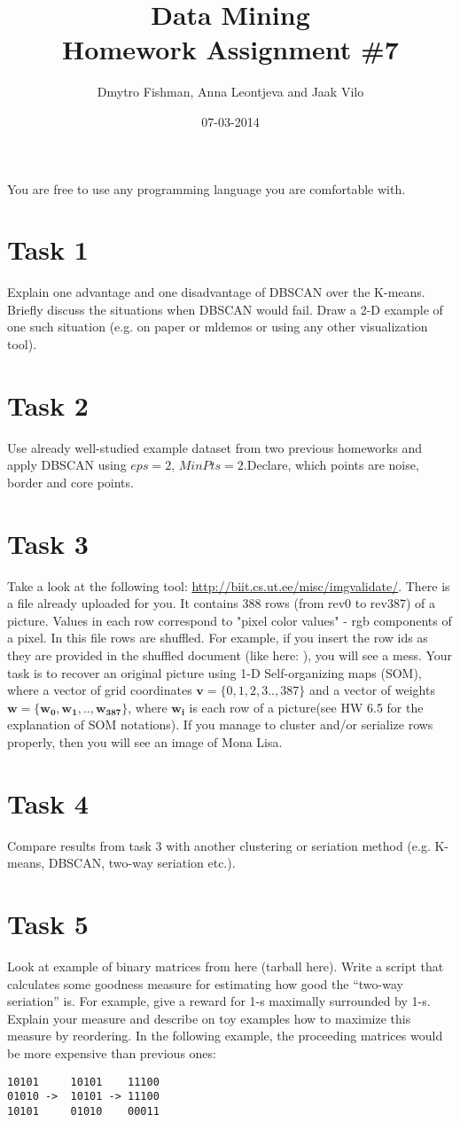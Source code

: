 \documentclass{article}
\title{Data Mining\\Homework Assignment \#7} %
\author{Dmytro Fishman, Anna Leontjeva and Jaak Vilo} %
\date{07-03-2014} %
\begin{document}
\maketitle %

You are free to use any programming language you are comfortable with. 

\section*{Task 1}
Explain one advantage and one disadvantage of DBSCAN over the K-means. Briefly discuss the situations when DBSCAN would fail. Draw a 2-D example of one such situation (e.g. on paper or mldemos or using any other visualization tool).
\section*{Task 2}
Use already well-studied example dataset from two previous homeworks and apply DBSCAN using $eps=2$, $MinPts=2$.Declare, which points are noise, border and core points. 

\section*{Task 3}
Take a look at the following tool: \url{http://biit.cs.ut.ee/misc/imgvalidate/}. There is a file already uploaded for you. It contains 388 rows (from rev0 to rev387) of a picture. Values in each row correspond to "pixel color values" - rgb components of a pixel. In this file rows are shuffled. For example, if you insert the row ids as they are provided in the shuffled document (like here: ), you will see a mess. Your task is to recover an original picture using 1-D Self-organizing maps (SOM), where a vector of grid coordinates $\mathbf{v} = \{0,1,2,3..,387\}$ and a vector of weights $\mathbf{w} = \{\boldsymbol{w_0,w_1,..,w_{387}}\}$, 
where $\boldsymbol{w_i}$ is each row of a picture(see HW 6.5 for the explanation of SOM notations).
If you manage to cluster and/or serialize rows properly, then you will see an image of Mona Lisa.

\section*{Task 4}
Compare results from task 3 with another clustering or seriation method (e.g. K-means, DBSCAN, two-way seriation etc.).

\section*{Task 5}
Look at example of binary matrices from here (tarball here). Write a script that calculates some goodness measure for estimating how good the “two-way seriation” is. For example, give a reward for 1-s maximally surrounded by 1-s. Explain your measure and describe on toy examples how to maximize this measure by reordering. In the following example, the proceeding matrices would be more expensive than previous ones:
\begin{verbatim}
10101     10101    11100
01010 ->  10101 -> 11100
10101     01010    00011 
\end{verbatim}
\end{document}
